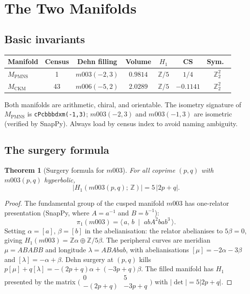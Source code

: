 \documentclass[11pt,a4paper]{article}
\newtheorem{theorem}{Theorem}
\theoremstyle{definition}
\theoremstyle{remark}
\newcommand{\ZZ}{\mathbb{Z}}
\newcommand{\Zfive}{\mathbb{Z}/5}
\newcommand{\MPMNS}{M_{\mathrm{PMNS}}}
\newcommand{\MCKM}{M_{\mathrm{CKM}}}
\begin{document}
\section{The Two Manifolds}
\label{sec:manifolds}

\subsection{Basic invariants}

\begin{center}
\begin{tabular}{lcccccc}
\toprule
Manifold & Census & Dehn filling & Volume & $H_1$
  & CS & Sym.\ \\
\midrule
$\MPMNS$ & 1  & $m003(-2,3)$ & $0.9814$ & $\Zfive$
  & $1/4$ & $\mathbb{Z}_2^2$ \\
$\MCKM$  & 43 & $m006(-5,2)$ & $2.0289$ & $\Zfive$
  & $-0.1141$ & $\mathbb{Z}_2^2$ \\
\bottomrule
\end{tabular}
\end{center}

Both manifolds are arithmetic, chiral, and orientable.
The isometry signature of $\MPMNS$ is \texttt{cPcbbbdxm(-1,3)};
$m003(-2,3)$ and $m003(-1,3)$ are isometric
(verified by SnapPy).
Always load by census index to avoid naming ambiguity.

\subsection{The surgery formula}
\label{subsec:surgery}

\begin{theorem}[Surgery formula for $m003$]
\label{thm:surgery}
For all coprime $(p,q)$ with $m003(p,q)$ hyperbolic,
\[
  |H_1(m003(p,q);\,\ZZ)| = 5\,|2p+q|.
\]
\end{theorem}

\begin{proof}
The fundamental group of the cusped manifold $m003$ has
one-relator presentation
(SnapPy, where $A = a^{-1}$ and $B = b^{-1}$):
\[
  \pi_1(m003)
  = \langle\, a,\,b \;\mid\; abA^2bab^3 \,\rangle.
\]
Setting $\alpha=[a]$, $\beta=[b]$ in the abelianisation:
the relator abelianises to $5\beta=0$, giving
$H_1(m003) = \ZZ\alpha \oplus \ZZ/5\beta$.
The peripheral curves are meridian $\mu = ABABB$ and
longitude $\lambda = ABAbab$, with abelianisations
$[\mu] = -2\alpha-3\beta$ and $[\lambda] = -\alpha+\beta$.
Dehn surgery at $(p,q)$ kills
$p[\mu]+q[\lambda] = -(2p+q)\alpha+(-3p+q)\beta$.
The filled manifold has $H_1$ presented by the matrix
$\bigl(\begin{smallmatrix}0&5\\-(2p+q)&-3p+q\end{smallmatrix}\bigr)$
with $|\det| = 5|2p+q|$.
\end{proof}
\end{document}
